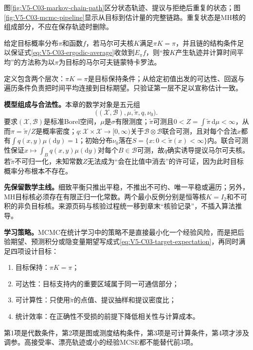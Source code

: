 图\ref{fig:V5-C03-markov-chain-path}区分状态轨迹、提议与拒绝后重复的状态；图\ref{fig:V5-C03-mcmc-pipeline}显示从目标到估计量的完整链路。重复状态是MH核的组成部分，不应在保存轨迹时删除。



\label{struct:V5-C03-CH07}
\begin{definition}[MCMC构造]
给定目标概率分布$\pi$和函数$f$，若马尔可夫核$K$满足$\pi K=\pi$，并且链的结构条件足以保证式\eqref{eq:V5-C03-ergodic-average}收敛到$E_\pi f$，则“按$K$产生轨迹并计算时间平均”的方法称为以$\pi$为目标的马尔可夫链蒙特卡罗法。
\end{definition}
定义包含两个层次：$\pi K=\pi$是目标保持条件；从给定初值出发的可达性、回返与遍历条件负责把时间平均连接到目标期望。只验证第一层不足以宣称估计一致。

\label{struct:V5-C03-CH08}
\textbf{模型组成与合法性。}本章的数学对象是五元组
\[
\bigl((\mathcal X,\mathcal B),\mu,\widetilde\pi,q,\nu_0\bigr).
\]
要求$(\mathcal X,\mathcal B)$是标准Borel空间，$\mu$是$\sigma$有限测度；$\widetilde\pi$可测且$0<Z=\int\widetilde\pi\,\mathrm d\mu<\infty$，从而$\pi=\widetilde\pi/Z$是概率密度；$q:\mathcal X\times\mathcal X\to[0,\infty)$关于$\mathcal B\otimes\mathcal B$联合可测，且对每个合法$x$都有$\int q(x,y)\mu(\mathrm dy)=1$；初始分布$\nu_0$落在$S=\{x:0<\widetilde\pi(x)<\infty\}$内。联合可测性保证$x\mapsto\int_Bq(x,y)\mu(\mathrm dy)$对每个$B\in\mathcal B$可测，故$q$确实诱导提议马尔可夫核。若$\widetilde\pi$不可归一化，未知常数$Z$无法成为“会在比值中消去”的许可证，因为此时目标概率分布根本不存在。

\begin{warningbox}
\textbf{先保留数学主线。}细致平衡只推出平稳，不推出不可约、唯一平稳或遍历；另外，MH目标核必须存在有限正归一化常数。两个最小反例分别是恒等核$K=I_2$和不可积的非负目标核。来源页码与核验过程统一移到章末“核验记录”，不插入算法推导。
\end{warningbox}

\label{struct:V5-C03-CH09}
\textbf{学习策略。}MCMC在统计学习中的策略不是直接最小化一个经验风险，而是把后验期望、预测积分或隐变量期望写成式\eqref{eq:V5-C03-target-expectation}，再同时满足四项设计目标：
\begin{enumerate}[leftmargin=2.2em]
  \item 目标保持：$\pi K=\pi$；
  \item 可达性：目标支持内的重要区域属于同一可通信部分；
  \item 可计算性：只使用$\widetilde\pi$的点值、提议抽样和提议密度比；
  \item 统计效率：在正确性不受损的前提下降低相关性与计算成本。
\end{enumerate}
第1项是代数条件，第2项是图或测度结构条件，第3项是可计算条件，第4项才涉及调参。高接受率、漂亮轨迹或小的经验MCSE都不能替代前3项。

